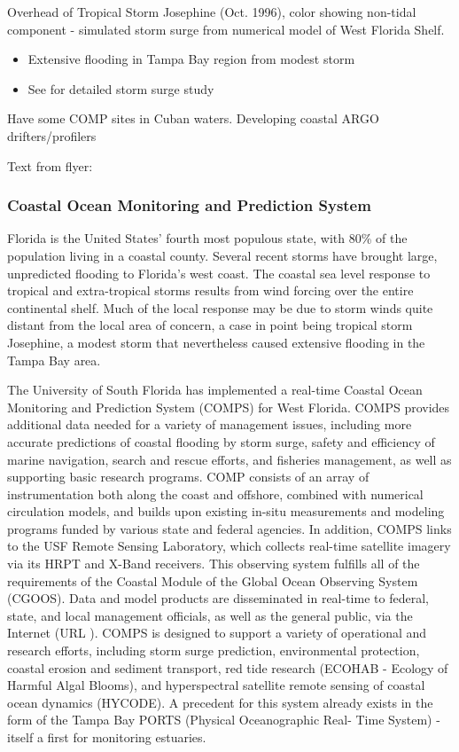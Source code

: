 Overhead of Tropical Storm Josephine (Oct. 1996), color showing non-tidal component - 
simulated storm surge from numerical model of West Florida Shelf.
\begin{itemize}
\item Extensive flooding in Tampa Bay region from modest storm
\item See  for detailed storm surge 
study
\end{itemize}

Have some COMP sites in Cuban waters.
Developing coastal ARGO drifters/profilers

Text from flyer:

\subsubsection{Coastal Ocean Monitoring and Prediction System}

Florida is the United States' fourth most populous state, with 80\% of
the population living in a coastal county.  Several recent storms have
brought large, unpredicted flooding to Florida's west coast.  The
coastal sea level response to tropical and extra-tropical storms
results from wind forcing over the entire continental shelf.  Much of
the local response may be due to storm winds quite distant from the
local area of concern, a case in point being tropical storm Josephine,
a modest storm that nevertheless caused extensive flooding in the
Tampa Bay area.

The University of South Florida has implemented a real-time Coastal
Ocean Monitoring and Prediction System (COMPS) for West Florida. COMPS
provides additional data needed for a variety of management issues,
including more accurate predictions of coastal flooding by storm
surge, safety and efficiency of marine navigation, search and rescue
efforts, and fisheries management, as well as supporting basic
research programs.  COMP consists of an array of instrumentation both
along the coast and offshore, combined with numerical circulation
models, and builds upon existing in-situ measurements and modeling
programs funded by various state and federal agencies.  In addition,
COMPS links to the USF Remote Sensing Laboratory, which collects
real-time satellite imagery via its HRPT and X-Band receivers.  This
observing system fulfills all of the requirements of the Coastal
Module of the Global Ocean Observing System (CGOOS).  Data and model
products are disseminated in real-time to federal, state, and local
management officials, as well as the general public, via the Internet
(URL ).  COMPS is designed to support
a variety of operational and research efforts, including storm surge
prediction, environmental protection, coastal erosion and sediment
transport, red tide research (ECOHAB - Ecology of Harmful Algal
Blooms), and hyperspectral satellite remote sensing of coastal ocean
dynamics (HYCODE).  A precedent for this system already exists in the
form of the Tampa Bay PORTS (Physical Oceanographic Real- Time System)
- itself a first for monitoring estuaries.

